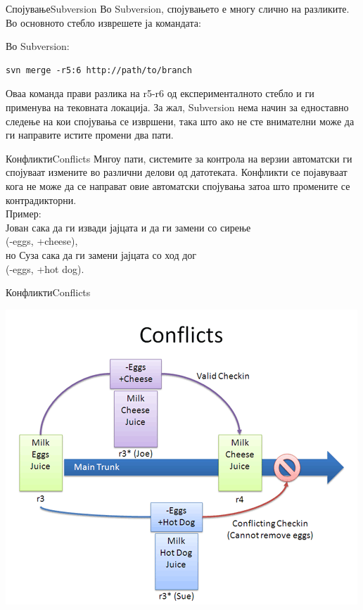 \begin{frame}[fragile]{Спојување}{Subversion}
Во Subversion, спојувањето е многу слично на разликите. Во основното
стебло изврешете ја командата:
\begin{exampleblock}{Во Subversion:}
\begin{verbatim}
svn merge -r5:6 http://path/to/branch
\end{verbatim}
\end{exampleblock}
\begin{scriptsize}
Оваа команда прави разлика на r5-r6 од експерименталното стебло и ги применува
на тековната локација. За жал, Subversion нема начин за едноставно следење на
кои спојувања се извршени, така што ако не сте внимателни може да ги направите
истите промени два пати.
\end{scriptsize}
\end{frame}


\begin{frame}{Конфликти}{Conflicts}
Мнгоу пати, системите за контрола на верзии автоматски ги спојуваат измените во
различни делови од датотеката. Конфликти се појавуваат кога не може да се
направат овие автоматски спојувања затоа што промените се контрадикторни.\\
Пример:\\
Јован сака да ги извади јајцата и да ги замени со сирење\\
(-eggs, +cheese),\\
но Суза сака да ги замени јајцата со ход дог\\
(-eggs, +hot dog).
\end{frame}

\begin{frame}{Конфликти}{Conflicts}
\begin{center}
    \includegraphics[scale=0.4]{images/vcs_conflict.png}
\end{center}
\end{frame}

